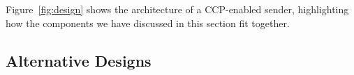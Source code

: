 \fi

Figure~\ref{fig:design} shows the architecture of a CCP-enabled sender, highlighting how the components we have discussed in this section fit together. 

\subsection{Alternative Designs}
\label{sec:design:alternatives}




